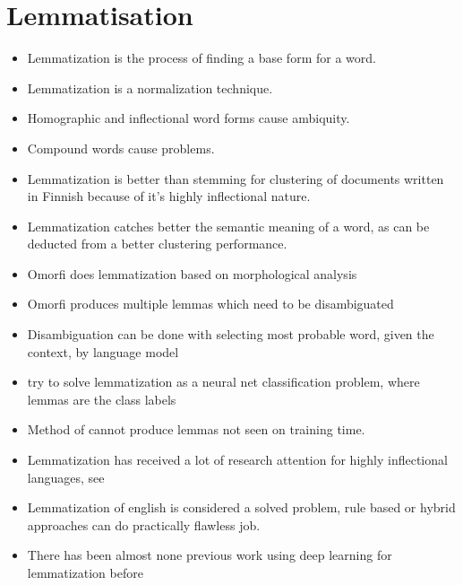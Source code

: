 \documentclass[12pt,a4paper,english
]{tutthesis}
\begin{document}
\section{Lemmatisation}
\label{se:lemmatisation}
\begin{itemize}
\item Lemmatization is the process of finding a base form for a word.
\item Lemmatization is a normalization technique. \cite{Korenius2004}
\item Homographic and inflectional word forms cause ambiquity. \cite{Korenius2004}
\item Compound words cause problems. \cite{Korenius2004}
\item Lemmatization is better than stemming for clustering of documents written in Finnish because of it's highly inflectional nature. \cite{Korenius2004}
\item Lemmatization catches better the semantic meaning of a word, as can be deducted from a better clustering performance.
\item Omorfi does lemmatization based on morphological analysis
\item Omorfi produces multiple lemmas which need to be disambiguated
\item Disambiguation can be done with selecting most probable word, given the context, by language model
\item \cite{Kestemont2016} try to solve lemmatization as a neural net classification problem, where lemmas are the class labels
\item Method of \cite{Kestemont2016} cannot produce lemmas not seen on training time.
\item Lemmatization has received a lot of research attention for highly inflectional languages, see \cite{Kestemont2016}
\item Lemmatization of english is considered a solved problem, rule based or hybrid approaches can do practically flawless job.
\item There has been almost none previous work using deep learning for lemmatization before \cite{Kestemont2016}
\end{itemize}
\end{document}
